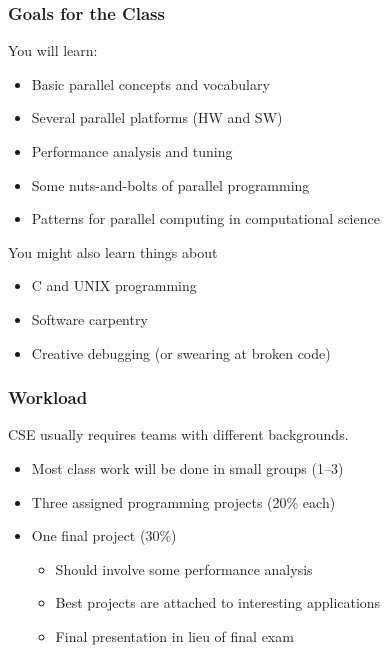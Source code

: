 \documentclass{beamer}
\begin{document}
\begin{frame}
  \frametitle{Goals for the Class}

  You will learn:
  \begin{itemize}
  \item Basic parallel concepts and vocabulary
  \item Several parallel platforms (HW and SW)
  \item Performance analysis and tuning
  \item Some nuts-and-bolts of parallel programming
  \item Patterns for parallel computing in computational science
  \end{itemize}

  \vspace{5mm}
  You might also learn things about
  \begin{itemize}
  \item C and UNIX programming
  \item Software carpentry
  \item Creative debugging (or swearing at broken code)
  \end{itemize}

\end{frame}


\begin{frame}
  \frametitle{Workload}

  CSE usually requires teams with different backgrounds.
  \begin{itemize}
  \item Most class work will be done in small groups (1--3)
  \item Three assigned programming projects (20\% each)
  \item One final project (30\%)
    \begin{itemize}
      \item Should involve some performance analysis
      \item Best projects are attached to interesting applications
      \item Final presentation in lieu of final exam
    \end{itemize}
  \end{itemize}
\end{frame}
\end{document}
